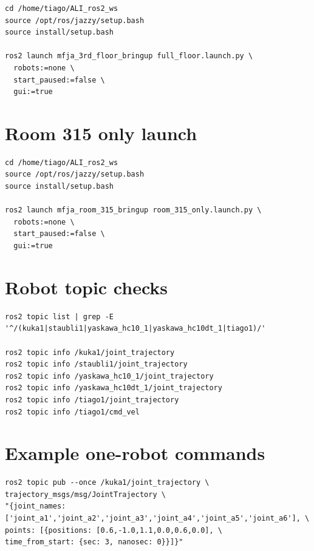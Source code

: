 \documentclass[12pt,a4paper]{report}
\newcommand{\codenext}[1]{\par\Needspace{#1\baselineskip}}
\begin{document}
\codenext{10}
\begin{lstlisting}[style=terminalcode,caption={Launching the full floor.}]
cd /home/tiago/ALI_ros2_ws
source /opt/ros/jazzy/setup.bash
source install/setup.bash

ros2 launch mfja_3rd_floor_bringup full_floor.launch.py \
  robots:=none \
  start_paused:=false \
  gui:=true
\end{lstlisting}

\section{Room 315 only launch}

\codenext{10}
\begin{lstlisting}[style=terminalcode,caption={Launching Room 315 only.}]
cd /home/tiago/ALI_ros2_ws
source /opt/ros/jazzy/setup.bash
source install/setup.bash

ros2 launch mfja_room_315_bringup room_315_only.launch.py \
  robots:=none \
  start_paused:=false \
  gui:=true
\end{lstlisting}

\section{Robot topic checks}

\codenext{10}
\begin{lstlisting}[style=terminalcode,caption={Checking robot control topics.}]
ros2 topic list | grep -E '^/(kuka1|staubli1|yaskawa_hc10_1|yaskawa_hc10dt_1|tiago1)/'

ros2 topic info /kuka1/joint_trajectory
ros2 topic info /staubli1/joint_trajectory
ros2 topic info /yaskawa_hc10_1/joint_trajectory
ros2 topic info /yaskawa_hc10dt_1/joint_trajectory
ros2 topic info /tiago1/joint_trajectory
ros2 topic info /tiago1/cmd_vel
\end{lstlisting}

\section{Example one-robot commands}

\codenext{12}
\begin{lstlisting}[style=terminalcode,caption={KUKA example command.}]
ros2 topic pub --once /kuka1/joint_trajectory \
trajectory_msgs/msg/JointTrajectory \
"{joint_names: ['joint_a1','joint_a2','joint_a3','joint_a4','joint_a5','joint_a6'], \
points: [{positions: [0.6,-1.0,1.1,0.0,0.6,0.0], \
time_from_start: {sec: 3, nanosec: 0}}]}"
\end{lstlisting}
\end{document}
